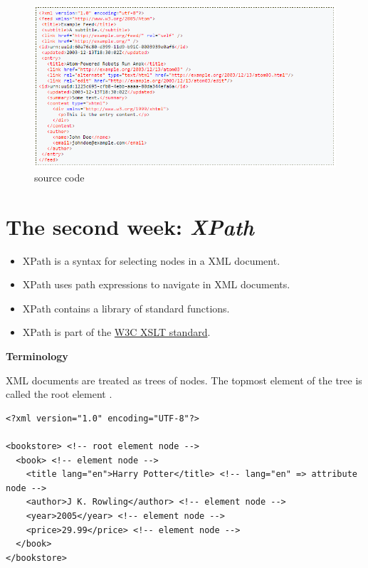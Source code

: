 \documentclass[11pt]{article}
\begin{document}
\begin{figure}[htbp]
  \begin{minipage}[b]{0.7\linewidth}
    \centering
    \includegraphics[width=0.9\linewidth]{Capture.png}
    \caption{source code}
    \label{fig:chapter001_dist_001}
  \end{minipage}
\end{figure}

\newpage

\section {The second week: \textit{XPath}}
\begin{itemize}
  \item XPath is a syntax for selecting nodes in a XML document.
  \item XPath uses path expressions to navigate in XML documents.
  \item XPath contains a library of standard functions.
  \item XPath is part of the \href{https://www.w3.org/TR/xslt}{W3C XSLT standard}.
\end{itemize}  

\textbf{Terminology}

XML documents are treated as trees of nodes. The topmost element of the tree is called the root element \cite{w3c1}.

\begin{lstlisting}
<?xml version="1.0" encoding="UTF-8"?>

<bookstore> <!-- root element node -->
  <book> <!-- element node -->
    <title lang="en">Harry Potter</title> <!-- lang="en" => attribute node -->
    <author>J K. Rowling</author> <!-- element node -->
    <year>2005</year> <!-- element node -->
    <price>29.99</price> <!-- element node -->
  </book>
</bookstore>
\end{lstlisting}
\end{document}
